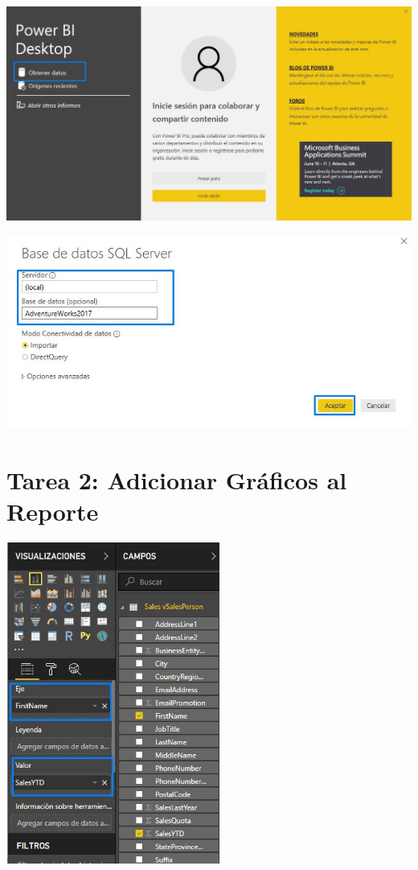 \documentclass[12pt,letterpaper]{article}
\begin{document}
\begin{center}
\includegraphics[width=\columnwidth]{images/bd}\newline
\end{center}
\begin{center}
\includegraphics[width=15cm]{images/conectar}\newline
\end{center}

\section{Tarea 2:  Adicionar Gráficos al Reporte} 
\begin{center}

\includegraphics[width=7cm]{images/grafico1}\newline
\end{center}
\end{document}
